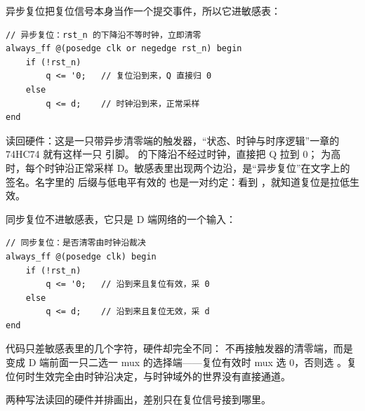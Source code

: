 异步复位把复位信号本身当作一个提交事件，所以它进敏感表：

\begin{lstlisting}
// 异步复位：rst_n 的下降沿不等时钟，立即清零
always_ff @(posedge clk or negedge rst_n) begin
    if (!rst_n)
        q <= '0;   // 复位沿到来，Q 直接归 0
    else
        q <= d;    // 时钟沿到来，正常采样
end
\end{lstlisting}

读回硬件：这是一只带异步清零端的触发器，“状态、时钟与时序逻辑”一章的 74HC74 就有这样一只  引脚。 的下降沿不经过时钟，直接把 Q 拉到 0； 为高时，每个时钟沿正常采样 D。敏感表里出现两个边沿，是“异步复位”在文字上的签名。名字里的  后缀与低电平有效的  也是一对约定：看到 ，就知道复位是拉低生效。

同步复位不进敏感表，它只是 D 端网络的一个输入：

\begin{lstlisting}
// 同步复位：是否清零由时钟沿裁决
always_ff @(posedge clk) begin
    if (!rst_n)
        q <= '0;   // 沿到来且复位有效，采 0
    else
        q <= d;    // 沿到来且复位无效，采 d
end
\end{lstlisting}

代码只差敏感表里的几个字符，硬件却完全不同： 不再接触发器的清零端，而是变成 D 端前面一只二选一 mux 的选择端——复位有效时 mux 选 0，否则选 。复位何时生效完全由时钟沿决定，与时钟域外的世界没有直接通道。

两种写法读回的硬件并排画出，差别只在复位信号接到哪里。

